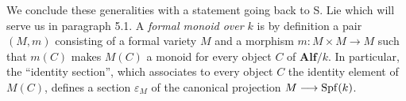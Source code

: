 We conclude these generalities with a statement going back to S. Lie which will serve us in paragraph 5.1. A \emph{formal monoid over $k$} is by definition a pair $(M,m)$ consisting of a formal variety $M$ and a morphism $m:M\times M\to M$ such that $m(C)$ makes $M(C)$ a monoid for every object $C$ of $\mathbf{Alf}/k$. In particular, the ``identity section'', which associates to every object $C$ the identity element of $M(C)$, defines a section $\varepsilon_M$ of the canonical projection $M\longrightarrow\operatorname{Spf}(k)$.
